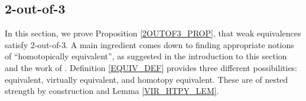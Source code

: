 \documentclass[a4paper,10pt
,draft
]{article}%
\renewcommand{\1}{\eta}%
\begin{document}

% 





\subsection{2-out-of-3}

In this section, we prove Proposition \ref{2OUTOF3_PROP}, that weak equivalences satisfy 2-out-of-3.
A main ingredient comes down to finding appropriate notions of ``homotopically equivalent'', as suggested in the introduction to this section and the work of \cite{Cav, BM13}.
Definition \ref{EQUIV_DEF} provides three different possibilities: equivalent, virtually equivalent, and homotopy equivalent.
These are of nested strength by construction and Lemma \ref{VIR_HTPY_LEM}.
\end{document}
